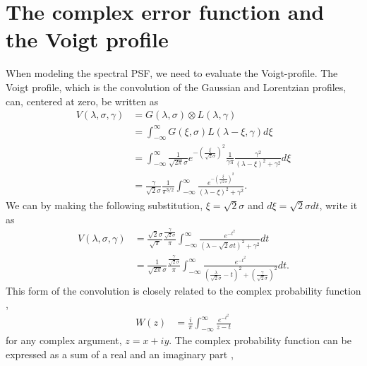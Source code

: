 \documentclass{aa}    %
\begin{document}
\section{The complex error function and the Voigt profile} \label{voigt}
When modeling the spectral PSF, we need to evaluate the Voigt-profile. The Voigt profile, which is the convolution of the Gaussian and Lorentzian profiles, can, centered at zero, be written as \citep{pagnini2010} 
\begin{equation} 
\begin{split}
V(\lambda,\sigma, \gamma)  
& = G(\lambda, \sigma)  \otimes L(\lambda, \gamma) \\
& = \int_{-\infty}^{\infty} G(\xi, \sigma) L(\lambda - \xi, \gamma) d\xi \\
& = \int_{-\infty}^{\infty} \frac{1}{\sqrt{2 \pi} \sigma} e^{- \left( \frac{\xi}{\sqrt{2} \sigma}  \right)^2 } \frac{1}{\gamma \pi} \frac{\gamma^2}{(\lambda - \xi)^2 + \gamma^2} d\xi \\
& = \frac{\gamma}{\sqrt{2} \sigma} \frac{1}{ \pi^{3/2}}   \int_{-\infty}^{\infty} \frac{e^{- \left( \frac{\xi}{\sqrt{2} \sigma}  \right)^2 }}{(\lambda - \xi)^2 + \gamma^2}.
\end{split}
\end{equation}
We can by making the following substitution, $\xi = \sqrt{2} \sigma$ and $d\xi = \sqrt{2} \sigma dt$, write it as
\begin{equation} 
\begin{split}
V(\lambda,\sigma, \gamma)  
& =  \frac{\sqrt{2} \sigma}{ \sqrt{{\pi}}} \frac{\frac{\gamma}{\sqrt{2} \sigma}}{\pi}  \int_{-\infty}^{\infty} \frac{e^{- t^2 }}{(\lambda - \sqrt{2} \sigma t)^2 + \gamma^2} dt \\
& = \frac{1}{\sqrt{2 \pi} \sigma}  \frac{\frac{\gamma}{\sqrt{2} \sigma}}{\pi}  \int_{-\infty}^{\infty} \frac{e^{- t^2 }}{\left(\frac{\lambda}{\sqrt{2} \sigma} -  t\right)^2 + \left(\frac{\gamma}{\sqrt{2} \sigma}\right)^2} dt.	
\end{split}
\end{equation}
This form of the convolution is closely related to the complex probability function \citep{letchworth2007, abrarov2015a},
\begin{equation} 
\begin{split}
W(z)  
& = \frac{i}{\pi} \int_{-\infty}^{\infty} \frac{e^{-t^2}}{z - t}  
\end{split}
\end{equation}
for any complex argument, $z = x + iy$. The complex probability function can be expressed as a sum of a real and an imaginary part \citep{benner1995, abrarov2015b},
\end{document}
